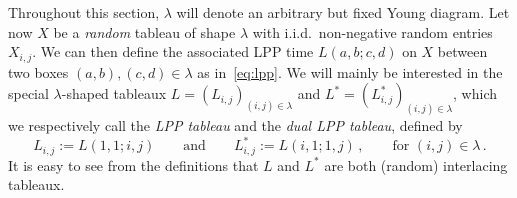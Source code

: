 \documentclass[a4paper,reqno,12pt]{amsart}
\theoremstyle{plain}
\theoremstyle{definition}
\newcommand{\firstmention}{\emph}
\newcommand{\1}{\mathbbm{1}}
\begin{document}
Throughout this section, $\lambda$ will denote an arbitrary but fixed Young diagram.
Let now $X$ be a \emph{random} tableau of shape $\lambda$ with i.i.d.\ non-negative random entries $X_{i,j}$.
We can then define the associated LPP time $L(a,b;c,d)$ on $X$ between two boxes $(a,b),(c,d)\in\lambda$ as in~\eqref{eq:lpp}.
We will mainly be interested in the special $\lambda$-shaped tableaux
$L = (L_{i,j})_{(i,j) \in \lambda}$ and $L^* = (L^*_{i,j})_{(i,j) \in \lambda}$, which we respectively call the \firstmention{LPP tableau} and the \firstmention{dual LPP tableau}, defined by
\begin{equation}
\label{eq:LPP&dualLPP}
L_{i,j} := L(1,1; i,j)
\qquad \text{and} \qquad
L^*_{i,j} := L(i,1; 1,j) \, ,
\qquad
\text{for } (i,j)\in \lambda \, .
\end{equation}
It is easy to see from the definitions that $L$ and $L^*$ are both (random) interlacing tableaux.
\end{document}
